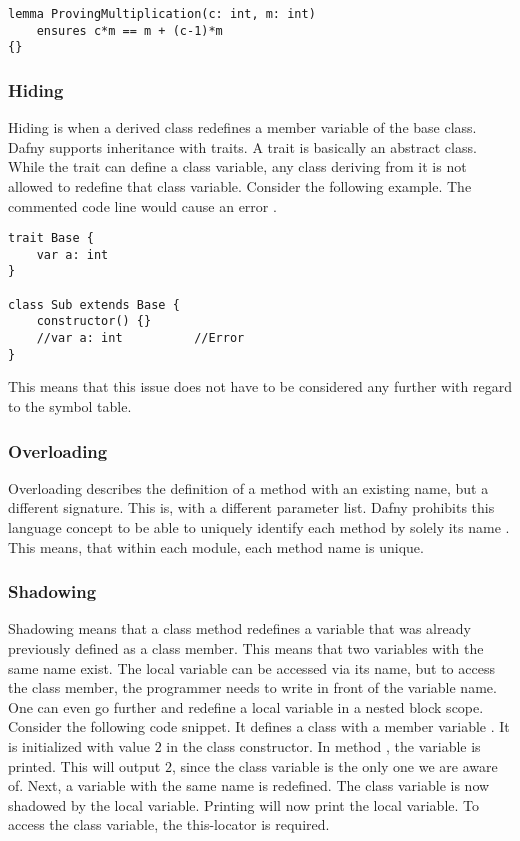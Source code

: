 \begin{lstlisting}[language=dafny, caption={Lemma}, captionpos=b, label={lst:lemma_example}]
lemma ProvingMultiplication(c: int, m: int)
    ensures c*m == m + (c-1)*m
{}
\end{lstlisting}

\subsubsection{Hiding}
Hiding is when a derived class redefines a member variable of the base class.
Dafny supports inheritance with traits.
A trait is basically an abstract class.
While the trait can define a class variable, any class deriving from it is not allowed to redefine that class variable.
Consider the following example.
The commented code line would cause an error \cite{dafnyReferenceManual}.

\begin{lstlisting}[language=dafny, caption={Hiding}, captionpos=b, label={lst:hiding}]
trait Base {
    var a: int
}

class Sub extends Base {
    constructor() {}
    //var a: int          //Error
}
\end{lstlisting}

This means that this issue does not have to be considered any further with regard to the symbol table.

\subsubsection{Overloading}
Overloading describes the definition of a method with an existing name, but a different signature.
This is, with a different parameter list.
Dafny prohibits this language concept to be able to uniquely identify each method by solely its name \cite{dafnyReferenceManual}.
This means, that within each module, each method name is unique.

\subsubsection{Shadowing}
Shadowing means that a class method redefines a variable that was already previously defined as a class member.
This means that two variables with the same name exist.
The local variable can be accessed via its name, but to access the class member, the programmer needs to write  in front of the variable name.\\

One can even go further and redefine a local variable in a nested block scope.
Consider the following code snippet.
It defines a class with a member variable .
It is initialized with value $2$ in the class constructor.
In method , the variable  is printed.
This will output $2$, since the class variable is the only one we are aware of.
Next, a variable with the same name is redefined.
The class variable is now shadowed by the local variable.
Printing  will now print the local variable.
To access the class variable, the this-locator is required.

